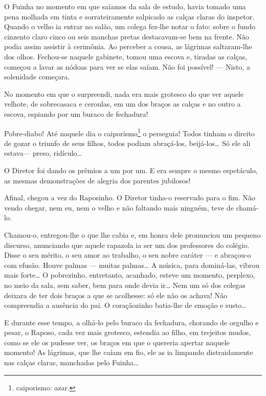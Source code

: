 O Fuinha no momento em que saíamos da sala de estudo, havia tomado uma
pena molhada em tinta e sorrateiramente salpicado as calças claras do
inspetor. Quando o velho ia entrar no salão, um colega fez-lhe notar o
fato: sobre o fundo cinzento claro cinco ou seis manchas pretas
destacavam-se bem na frente. Não podia assim assistir à cerimônia. Ao
perceber a cousa, as lágrimas saltaram-lhe dos olhos. Fechou-se naquele
gabinete, tomou uma escova e, tiradas as calças, começou a lavar as
nódoas para ver se elas saíam. Não foi possível! --- Nisto, a solenidade
começara.

No momento em que o surpreendi, nada era mais grotesco do que ver aquele
velhote, de sobrecasaca e ceroulas, em um dos braços as calças e no
outro a escova, espiando por um buraco de fechadura!

Pobre-diabo! Até naquele dia o caiporismo\footnote{caiporismo: azar.} o
perseguia! Todos tinham o direito de gozar o triunfo de seus filhos,
todos podiam abraçá-los, beijá-los\ldots{} Só ele ali estava--- preso,
ridículo\ldots{}

O Diretor foi dando os prêmios a um por um. E era sempre o mesmo
espetáculo, as mesmas demonstrações de alegria dos parentes jubilosos!

Afinal, chegou a vez do Raposinho. O Diretor tinha-o reservado para o
fim. Não vendo chegar, nem eu, nem o velho e não faltando mais ninguém,
teve de chamá-lo.

Chamou-o, entregou-lhe o que lhe cabia e, em honra dele pronunciou um
pequeno discurso, anunciando que aquele rapazola ia ser um dos
professores do colégio. Disse o seu mérito, o seu amor ao trabalho, o
seu nobre caráter --- e abraçou-o com efusão. Houve palmas --- muitas
palmas\ldots{} A música, para dominá-las, vibrou mais forte\ldots{} O pobrezinho,
entretanto, acanhado, esteve um momento, perplexo, no meio da sala, sem
saber, bem para onde devia ir\ldots{} Nem um só dos colegas deixara de ter
dois braços a que se acolhesse: só ele não os achava! Não compreendia a
ausência do pai. O coraçãozinho batia-lhe de emoção e susto\ldots{}

E durante esse tempo, a olhá-lo pelo buraco da fechadura, chorando de
orgulho e pesar, o Raposo, cada vez mais grotesco, estendia ao filho, em
trejeitos mudos, como se ele os pudesse ver, os braços em que o quereria
apertar naquele momento! As lágrimas, que lhe caíam em fio, ele as ia
limpando distraidamente nas calças claras, manchadas pelo Fuinha\ldots{}

